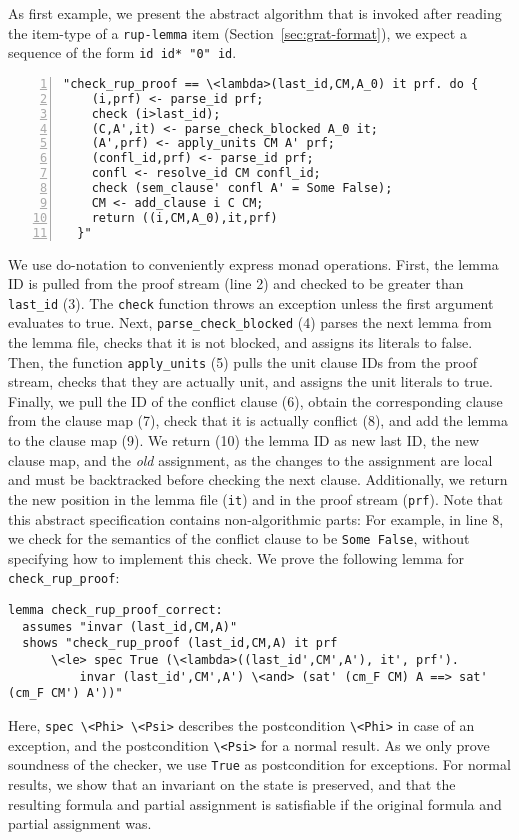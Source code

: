 \documentclass{llncs}
\newcommand{\isai}{\lstinline[language=isabelle,basicstyle=\normalsize\ttfamily\slshape]}
\newcommand{\lsti}{\lstinline[language={},literate={}]}
\begin{document}
As first example, we present the abstract algorithm that is invoked after reading the item-type of a \lsti{rup-lemma} item (\cf Section~\ref{sec:grat-format}),
\ie we expect a sequence of the form \lstinline[language={},literate={}]{id id* "0" id}.
\begin{lstlisting}[numbers=left, xleftmargin=2em]
  "check_rup_proof == \<lambda>(last_id,CM,A_0) it prf. do {
    (i,prf) <- parse_id prf;
    check (i>last_id);
    (C,A',it) <- parse_check_blocked A_0 it;
    (A',prf) <- apply_units CM A' prf;
    (confl_id,prf) <- parse_id prf;
    confl <- resolve_id CM confl_id;
    check (sem_clause' confl A' = Some False);
    CM <- add_clause i C CM;
    return ((i,CM,A_0),it,prf)
  }"
\end{lstlisting}
We use do-notation to conveniently express monad operations. 
First, the lemma ID is pulled from the proof stream (line 2) and checked to be greater than \isai{last_id} (3).
The \isai$check$ function throws an exception unless the first argument evaluates to true.
Next, \isai{parse_check_blocked} (4) parses the next lemma from the lemma file, checks that it is not blocked, and assigns its literals to false.
Then, the function \isai$apply_units$ (5) pulls the unit clause IDs from the proof stream, checks that they are actually unit, and assigns the unit literals to true.
Finally, we pull the ID of the conflict clause (6), obtain the corresponding clause from the clause map (7), check that it is actually conflict (8), and add the lemma to the clause map (9).
We return (10) the lemma ID as new last ID, the new clause map, and the \emph{old} assignment, as the changes to the assignment are local and must be backtracked before checking
the next clause. Additionally, we return the new position in the lemma file (\isai$it$) and in the proof stream (\isai$prf$).
Note that this abstract specification contains non-algorithmic parts: For example, in line 8, we check for the semantics of the conflict clause to be \isai{Some False}, without
specifying how to implement this check.
%
We prove the following lemma for \isai{check_rup_proof}:
\begin{lstlisting}
lemma check_rup_proof_correct: 
  assumes "invar (last_id,CM,A)"
  shows "check_rup_proof (last_id,CM,A) it prf
      \<le> spec True (\<lambda>((last_id',CM',A'), it', prf'). 
          invar (last_id',CM',A') \<and> (sat' (cm_F CM) A ==> sat' (cm_F CM') A'))"
\end{lstlisting}
Here, \isai{spec \<Phi> \<Psi>} describes the postcondition \isai$\<Phi>$ in case of an exception, and the postcondition \isai$\<Psi>$ for a normal result.
As we only prove soundness of the checker, we use \isai$True$ as postcondition for exceptions. For normal results, 
we show that an invariant on the state is preserved, and that the resulting formula and partial assignment is satisfiable if the original formula and partial assignment was.
\end{document}
